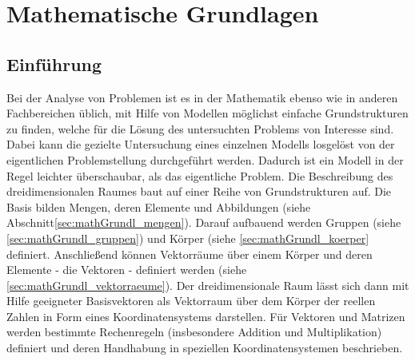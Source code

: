 \chapter{Mathematische Grundlagen}\label{ch:mathGrundl}
\section{Einf\"uhrung}\label{sec:mathGrundl_einfuehrung}
    Bei der Analyse von Problemen ist es in der Mathematik  ebenso wie in anderen Fachbereichen \"ublich, mit Hilfe von Modellen m\"oglichst einfache Grundstrukturen zu finden, welche f\"ur die L\"osung des untersuchten Problems von Interesse sind. Dabei kann die gezielte Untersuchung eines einzelnen Modells losgel\"ost von der eigentlichen Problemstellung durchgef\"uhrt werden. Dadurch ist ein Modell in der Regel leichter \"uberschaubar, als das eigentliche Problem. \newline
    Die Beschreibung des dreidimensionalen Raumes baut auf einer Reihe von Grundstrukturen auf. Die Basis bilden Mengen, deren Elemente und Abbildungen (siehe Abschnitt\ref{sec:mathGrundl_mengen}). Darauf aufbauend werden Gruppen (siehe \ref{sec:mathGrundl_gruppen}) und K\"orper (siehe \ref{sec:mathGrundl_koerper} definiert. Anschlie\ss{}end k\"onnen Vektorr\"aume \"uber einem K\"orper und deren Elemente - die Vektoren - definiert werden (siehe \ref{sec:mathGrundl_vektorraeume}). Der dreidimensionale Raum l\"asst sich dann mit Hilfe geeigneter Basisvektoren als Vektorraum \"uber dem K\"orper der reellen Zahlen in Form eines Koordinatensystems darstellen. F\"ur Vektoren und Matrizen werden bestimmte Rechenregeln (insbesondere Addition und Multiplikation) definiert und deren Handhabung in speziellen Koordinatensystemen beschrieben. \newline
    
